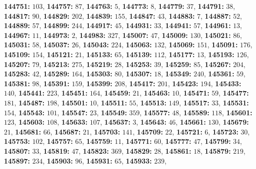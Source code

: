 \textsf{\bfseries 144751:} $103$, \textsf{\bfseries 144757:} $87$, \textsf{\bfseries 144763:} $5$, \textsf{\bfseries 144773:} $8$, \textsf{\bfseries 144779:} $37$, \textsf{\bfseries 144791:} $38$, \textsf{\bfseries 144817:} $90$, \textsf{\bfseries 144829:} $202$, \textsf{\bfseries 144839:} $155$, \textsf{\bfseries 144847:} $43$, \textsf{\bfseries 144883:} $7$, \textsf{\bfseries 144887:} $52$, \textsf{\bfseries 144889:} $57$, \textsf{\bfseries 144899:} $244$, \textsf{\bfseries 144917:} $45$, \textsf{\bfseries 144931:} $33$, \textsf{\bfseries 144941:} $57$, \textsf{\bfseries 144961:} $13$, \textsf{\bfseries 144967:} $11$, \textsf{\bfseries 144973:} $2$, \textsf{\bfseries 144983:} $327$, \textsf{\bfseries 145007:} $47$, \textsf{\bfseries 145009:} $130$, \textsf{\bfseries 145021:} $86$, \textsf{\bfseries 145031:} $58$, \textsf{\bfseries 145037:} $26$, \textsf{\bfseries 145043:} $224$, \textsf{\bfseries 145063:} $132$, \textsf{\bfseries 145069:} $151$, \textsf{\bfseries 145091:} $176$, \textsf{\bfseries 145109:} $154$, \textsf{\bfseries 145121:} $21$, \textsf{\bfseries 145133:} $65$, \textsf{\bfseries 145139:} $112$, \textsf{\bfseries 145177:} $13$, \textsf{\bfseries 145193:} $126$, \textsf{\bfseries 145207:} $79$, \textsf{\bfseries 145213:} $275$, \textsf{\bfseries 145219:} $28$, \textsf{\bfseries 145253:} $39$, \textsf{\bfseries 145259:} $85$, \textsf{\bfseries 145267:} $204$, \textsf{\bfseries 145283:} $42$, \textsf{\bfseries 145289:} $164$, \textsf{\bfseries 145303:} $80$, \textsf{\bfseries 145307:} $18$, \textsf{\bfseries 145349:} $240$, \textsf{\bfseries 145361:} $59$, \textsf{\bfseries 145381:} $98$, \textsf{\bfseries 145391:} $159$, \textsf{\bfseries 145399:} $208$, \textsf{\bfseries 145417:} $201$, \textsf{\bfseries 145423:} $194$, \textsf{\bfseries 145433:} $140$, \textsf{\bfseries 145441:} $223$, \textsf{\bfseries 145451:} $164$, \textsf{\bfseries 145459:} $21$, \textsf{\bfseries 145463:} $10$, \textsf{\bfseries 145471:} $59$, \textsf{\bfseries 145477:} $181$, \textsf{\bfseries 145487:} $198$, \textsf{\bfseries 145501:} $10$, \textsf{\bfseries 145511:} $55$, \textsf{\bfseries 145513:} $149$, \textsf{\bfseries 145517:} $33$, \textsf{\bfseries 145531:} $154$, \textsf{\bfseries 145543:} $101$, \textsf{\bfseries 145547:} $23$, \textsf{\bfseries 145549:} $359$, \textsf{\bfseries 145577:} $48$, \textsf{\bfseries 145589:} $118$, \textsf{\bfseries 145601:} $123$, \textsf{\bfseries 145603:} $108$, \textsf{\bfseries 145633:} $107$, \textsf{\bfseries 145637:} $3$, \textsf{\bfseries 145643:} $46$, \textsf{\bfseries 145661:} $130$, \textsf{\bfseries 145679:} $21$, \textsf{\bfseries 145681:} $66$, \textsf{\bfseries 145687:} $21$, \textsf{\bfseries 145703:} $141$, \textsf{\bfseries 145709:} $22$, \textsf{\bfseries 145721:} $6$, \textsf{\bfseries 145723:} $30$, \textsf{\bfseries 145753:} $102$, \textsf{\bfseries 145757:} $65$, \textsf{\bfseries 145759:} $11$, \textsf{\bfseries 145771:} $60$, \textsf{\bfseries 145777:} $47$, \textsf{\bfseries 145799:} $34$, \textsf{\bfseries 145807:} $33$, \textsf{\bfseries 145819:} $47$, \textsf{\bfseries 145823:} $369$, \textsf{\bfseries 145829:} $28$, \textsf{\bfseries 145861:} $18$, \textsf{\bfseries 145879:} $219$, \textsf{\bfseries 145897:} $234$, \textsf{\bfseries 145903:} $96$, \textsf{\bfseries 145931:} $65$, \textsf{\bfseries 145933:} $239$, 
